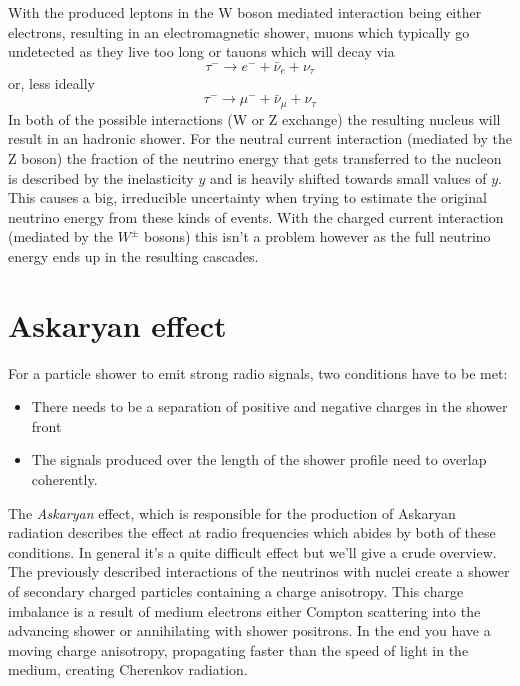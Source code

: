 With the produced leptons in the W boson mediated interaction being either electrons,
resulting in an electromagnetic shower, muons which typically go undetected as they live
too long or
tauons which will decay via
\begin{equation}
	\tau^- \rightarrow e^- + \bar{\nu}_e + \nu_\tau
\end{equation}
or, less ideally
\begin{equation}
	\tau^- \rightarrow \mu^- + \bar{\nu}_\mu + \nu_\tau
\end{equation}
In both of the possible interactions (W or Z exchange) the resulting nucleus
will result in an hadronic shower. For the neutral current interaction (mediated
by the Z boson) the fraction of the neutrino energy that gets transferred to
the nucleon is described by the inelasticity $y$ and is heavily shifted towards
small values of $y$\cite{elasticity_y}. This causes a big, irreducible
uncertainty when trying to estimate the original neutrino energy from these
kinds of events.  With the charged current interaction (mediated by the $W^\pm$
bosons) this isn't a problem however as the full neutrino energy ends up in the
resulting cascades.
\section{Askaryan effect}
\label{sec:Askaryan}
For a particle shower to emit strong radio signals, two conditions have to be met:
\begin{itemize}
	\item There needs to be a separation of positive and negative charges in the shower front 
	\item The signals produced over the length of the shower profile need to overlap coherently.
\end{itemize}
The \textit{Askaryan} \cite{Askaryan} effect, which is responsible for the
production of Askaryan radiation describes the effect at radio frequencies
which abides by both of these conditions.  In general it's a quite difficult
effect but we'll give a crude overview.  The previously described interactions
of the neutrinos with nuclei create a shower of secondary charged particles
containing a charge anisotropy.  This charge imbalance is a result of medium
electrons either Compton scattering into the advancing shower or annihilating
with shower positrons.  In the end you have a moving charge anisotropy,
propagating faster than the speed of light in the medium, creating Cherenkov
radiation.  

